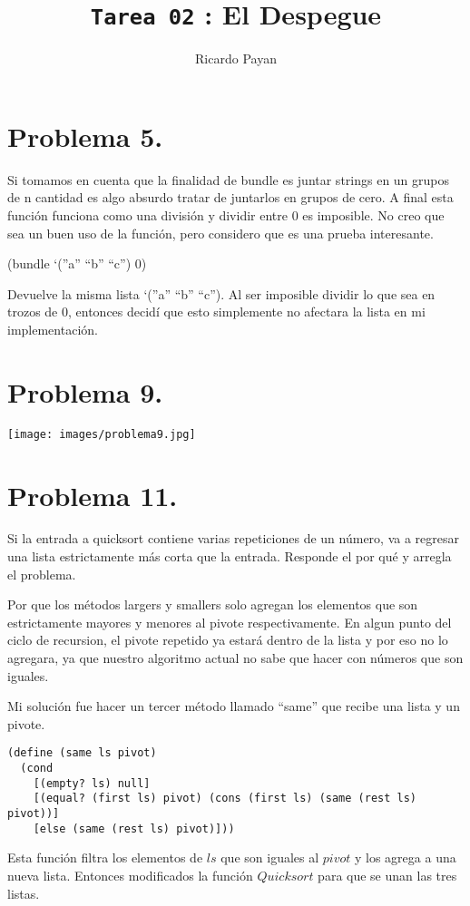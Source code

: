 \documentclass{article}
\title{\texttt{Tarea 02} : El Despegue }
\author{Ricardo Payan}
\begin{document}
\maketitle

\section*{Problema 5.}


Si tomamos en cuenta que la finalidad de bundle es juntar strings en un grupos de n cantidad es algo absurdo tratar de juntarlos en grupos de cero. A final esta función funciona como una división y dividir entre 0 es imposible. No creo que sea un buen uso de la función, pero considero que es una prueba interesante.

(bundle ‘(”a” “b” “c”) 0)

Devuelve la misma lista  ‘(”a” “b” “c”). Al ser imposible dividir lo que sea en trozos de 0, entonces decidí que esto simplemente no afectara la lista en mi implementación.

\section*{Problema 9.}
\texttt{[image: images/problema9.jpg]}

\section*{Problema 11.}
Si la entrada a quicksort contiene varias repeticiones de un número, va a regresar
una lista estrictamente más corta que la entrada. Responde el por qué y arregla el problema.

Por que los métodos largers y smallers solo agregan los elementos que son estrictamente mayores y menores al pivote respectivamente. En algun punto del ciclo de recursion, el pivote repetido ya estará dentro de la lista y por eso no lo agregara, ya que nuestro algoritmo actual no sabe que hacer con números que son iguales.

Mi solución fue hacer un tercer método llamado “same” que recibe una lista y un pivote.


\begin{lstlisting}
(define (same ls pivot)
  (cond
    [(empty? ls) null]
    [(equal? (first ls) pivot) (cons (first ls) (same (rest ls) pivot))]
    [else (same (rest ls) pivot)]))
\end{lstlisting}

Esta función filtra los elementos de $ls$ que son iguales al $pivot$ y los agrega a una nueva lista. Entonces modificados la función $Quicksort$ para que se unan las tres listas.
\end{document}
